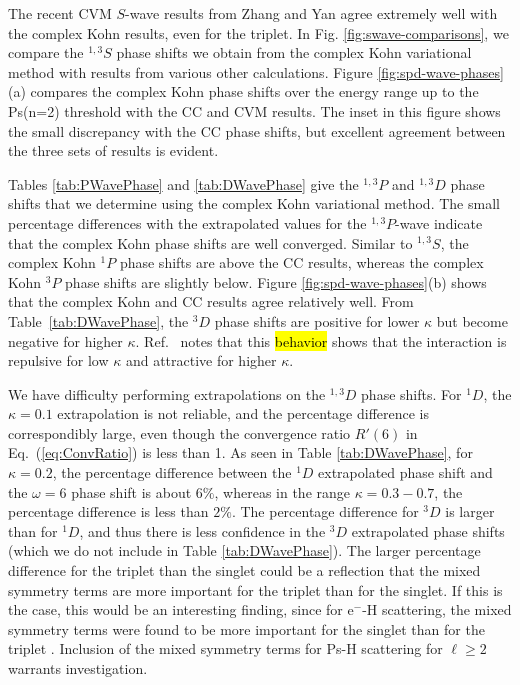 \documentclass[preprint,showpacs,showkeys,preprintnumbers,amsmath,amssymb,longbibliography,pra,aps]{revtex4-1}
\begin{document}
{The recent CVM $S$-wave results from Zhang and Yan \cite{Zhang2012} agree 
extremely well with the complex Kohn results, even for the triplet. In Fig.
\ref{fig:swave-comparisons},
we compare the $^{1,3}S$ phase shifts we obtain from 
the complex Kohn variational method with results from various other calculations. Figure 
\ref{fig:spd-wave-phases}(a) compares the complex Kohn phase shifts over the 
energy range up to the Ps(n=2) threshold with the CC and CVM results. The 
inset in this figure shows the small discrepancy with the CC phase shifts, 
but excellent agreement between the three sets of results is evident. 

Tables \ref{tab:PWavePhase} and \ref{tab:DWavePhase} give the $^{1,3}P$ and
$^{1,3}D$
 phase shifts that we determine using the complex Kohn variational 
method. The small percentage differences with the extrapolated values for the 
$^{1,3}P$-wave indicate that the complex Kohn phase shifts are well converged.
Similar to $^{1,3}S$, the complex Kohn $^1P$ phase shifts are above the CC
results, whereas the complex Kohn $^3P$ phase shifts are slightly below.
Figure \ref{fig:spd-wave-phases}(b) shows that the 
complex Kohn and CC results agree relatively well.
From Table~\ref{tab:DWavePhase}, the $^3D$ phase shifts are positive for
lower $\kappa$ but become negative for higher $\kappa$. 
Ref.~\cite{Blackwood2002} notes that this \hl{behavior} shows that the interaction
is repulsive for low $\kappa$ and attractive for higher $\kappa$.

We have difficulty performing extrapolations on the $^{1,3}D$ phase shifts.
For $^1D$, the $\kappa = 0.1$ extrapolation is not reliable, and the
percentage difference is correspondibly large, even though the
convergence ratio $R'(6)$ in Eq.~(\ref{eq:ConvRatio}) is less than 1. As seen in Table
\ref{tab:DWavePhase}, for $\kappa = 0.2$, the percentage difference
between the $^1D$ extrapolated phase shift and the $\omega = 6$ 
phase shift is about $6\%$,
whereas in the range $\kappa = 0.3 - 0.7$, the percentage difference is
less than $2\%$. The percentage difference for $^3D$ is larger than for $^1D$,
and thus there is less confidence in the $^3D$ extrapolated phase shifts (which we
do not include in Table \ref{tab:DWavePhase}). The larger percentage
difference for the triplet than the singlet could be a reflection that the
mixed symmetry terms are more important for the
triplet than for the singlet. If this is the case, this would be an interesting
finding, since for e$^-$-H scattering, the mixed symmetry terms were found to
be more important for the singlet than
for the triplet \cite{VanReeth2015}. Inclusion of the mixed symmetry terms for
Ps-H scattering for $\ell \geq 2$ warrants investigation.

}
\end{document}
